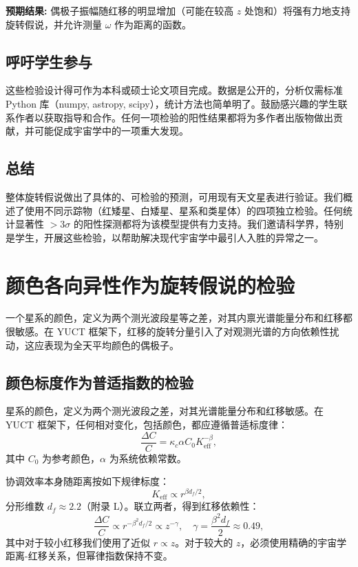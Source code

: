 \documentclass[11pt,a4paper]{article}
\begin{document}
	\textbf{预期结果:} 偶极子振幅随红移的明显增加（可能在较高 \(z\) 处饱和）将强有力地支持旋转假说，并允许测量 \(\omega\) 作为距离的函数。
	
	\subsection{呼吁学生参与}
	
	这些检验设计得可作为本科或硕士论文项目完成。数据是公开的，分析仅需标准 Python 库（numpy, astropy, scipy），统计方法也简单明了。鼓励感兴趣的学生联系作者以获取指导和合作。任何一项检验的阳性结果都将为多作者出版物做出贡献，并可能促成宇宙学中的一项重大发现。
	
	\subsection{总结}
	
	整体旋转假说做出了具体的、可检验的预测，可用现有天文星表进行验证。我们概述了使用不同示踪物（红矮星、白矮星、星系和类星体）的四项独立检验。任何统计显著性 \(>3\sigma\) 的阳性探测都将为该模型提供有力支持。我们邀请科学界，特别是学生，开展这些检验，以帮助解决现代宇宙学中最引人入胜的异常之一。
	
	\section{颜色各向异性作为旋转假说的检验}
	
	一个星系的颜色，定义为两个测光波段星等之差，对其内禀光谱能量分布和红移都很敏感。在 YUCT 框架下，红移的旋转分量引入了对观测光谱的方向依赖性扰动，这应表现为全天平均颜色的偶极子。
	
	\subsection{颜色标度作为普适指数的检验}
	
	星系的颜色，定义为两个测光波段之差，对其光谱能量分布和红移敏感。在 YUCT 框架下，任何相对变化，包括颜色，都应遵循普适标度律：
	\begin{equation}
		\frac{\Delta C}{C} = \kappa_c \alpha C_0 K_{\mathrm{eff}}^{-\beta},
	\end{equation}
	其中 \(C_0\) 为参考颜色，\(\alpha\) 为系统依赖常数。
	
	协调效率本身随距离按如下规律标度：
	\begin{equation}
		K_{\mathrm{eff}} \propto r^{\beta d_f / 2},
	\end{equation}
	分形维数 \(d_f \approx 2.2\)（附录 L）。联立两者，得到红移依赖性：
	\begin{equation}
		\frac{\Delta C}{C} \propto r^{-\beta^2 d_f / 2} \propto z^{-\gamma}, \quad \gamma = \frac{\beta^2 d_f}{2} \approx 0.49,
	\end{equation}
	其中对于较小红移我们使用了近似 \(r \propto z\)。对于较大的 \(z\)，必须使用精确的宇宙学距离-红移关系，但幂律指数保持不变。
	
\end{document}
